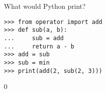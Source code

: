 \question What would Python print?
\begin{lstlisting}
>>> from operator import add
>>> def sub(a, b):
...     sub = add
...     return a - b
>>> add = sub
>>> sub = min
>>> print(add(2, sub(2, 3)))
\end{lstlisting}

\begin{solution}[1in]
0
\end{solution}

